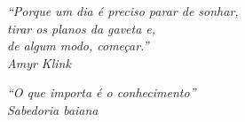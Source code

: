 \begin{epigrafe}
    \vspace*{\fill}
  \begin{flushright}
    \emph{``Porque um dia é preciso parar de sonhar, \\
    tirar os planos da gaveta e, \\
    de algum modo, começar.'' \\
    Amyr Klink}
  \end{flushright}
  \begin{flushright}
    \emph{``O que importa é o conhecimento'' \\
    Sabedoria baiana}
  \end{flushright}
\end{epigrafe}


